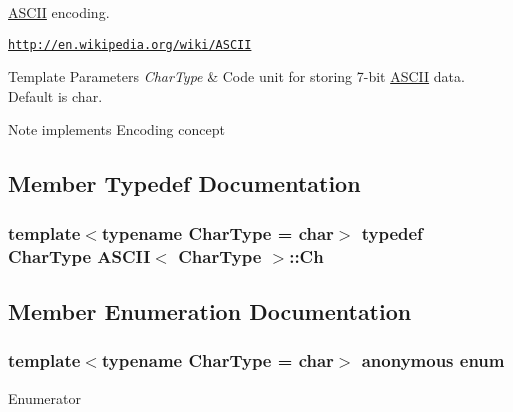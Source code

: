 \hyperlink{structASCII}{A\+S\+C\+II} encoding. 

\href{http://en.wikipedia.org/wiki/ASCII}{\tt http\+://en.\+wikipedia.\+org/wiki/\+A\+S\+C\+II} 
\begin{DoxyTemplParams}{Template Parameters}
{\em Char\+Type} & Code unit for storing 7-\/bit \hyperlink{structASCII}{A\+S\+C\+II} data. Default is char. \\
\hline
\end{DoxyTemplParams}
\begin{DoxyNote}{Note}
implements Encoding concept 
\end{DoxyNote}


\subsection{Member Typedef Documentation}
\subsubsection[{\texorpdfstring{Ch}{Ch}}]{\setlength{\rightskip}{0pt plus 5cm}template$<$typename Char\+Type  = char$>$ typedef Char\+Type {\bf A\+S\+C\+II}$<$ Char\+Type $>$\+::{\bf Ch}}\hypertarget{structASCII_a1baf6e7914f165be952c30db664cefb4}{}\label{structASCII_a1baf6e7914f165be952c30db664cefb4}


\subsection{Member Enumeration Documentation}
\subsubsection[{\texorpdfstring{anonymous enum}{anonymous enum}}]{\setlength{\rightskip}{0pt plus 5cm}template$<$typename Char\+Type  = char$>$ anonymous enum}\hypertarget{structASCII_a2f2c796586b1f9b18c7ff5c452eba0a9}{}\label{structASCII_a2f2c796586b1f9b18c7ff5c452eba0a9}
\begin{Desc}
\item[Enumerator]\par
\begin{description}
\item[{\em 
support\+Unicode\hypertarget{structASCII_a2f2c796586b1f9b18c7ff5c452eba0a9a672ec36bd3404c3050a9111a934cbe00}{}\label{structASCII_a2f2c796586b1f9b18c7ff5c452eba0a9a672ec36bd3404c3050a9111a934cbe00}
}]\end{description}
\end{Desc}


